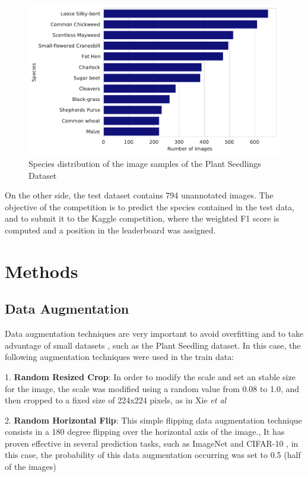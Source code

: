 \documentclass[11pt,onecolumn,titlepage,letterpaper]{article}
\begin{document}
\begin{figure}[h]
	\begin{center}
		\includegraphics[width=0.8\linewidth]{species_freq.pdf}
	\end{center}
	\caption{Species distribution of the image samples of the Plant Seedlings Dataset}
	\label{fig:distribution}
\end{figure}

On the other side, the test dataset contains 794 unannotated images. The objective of the competition is to predict the species contained in the test data, and to submit it to the Kaggle competition, where the weighted F1 score is computed and a position in the leaderboard was assigned.

\section{Methods}

\subsection{Data Augmentation}

Data augmentation techniques are very important to avoid overfitting and to take advantage of small datasets \cite{Shorten2019}, such as the Plant Seedling dataset. In this case, the following augmentation techniques were used in the train data:

1. \textbf{Random Resized Crop}: In order to modify the scale and set an stable size for the image, the scale was modified using a random value from 0.08 to 1.0, and then cropped to a fixed size of 224x224 pixels, as in Xie \textit{et al} \cite{Xie2017}

2. \textbf{Random Horizontal Flip}: This simple flipping data augmentation technique consists in a 180 degree flipping over the horizontal axis of the image., It has proven effective in several prediction tasks, such as ImageNet and CIFAR-10 \cite{Shorten2019}, in this case, the probability of this data augmentation occurring was set to 0.5 (half of the images)
\end{document}

